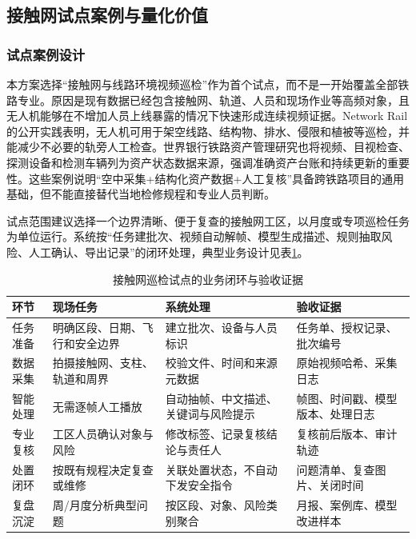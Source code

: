 \documentclass[UTF8,a4paper,zihao=-4]{ctexart}
\begin{document}
\subsection{接触网试点案例与量化价值}

\subsubsection{试点案例设计}

本方案选择“接触网与线路环境视频巡检”作为首个试点，而不是一开始覆盖全部铁路专业。原因是现有数据已经包含接触网、轨道、人员和现场作业等高频对象，且无人机能够在不增加人员上线暴露的情况下快速形成连续视频证据。Network Rail 的公开实践表明，无人机可用于架空线路、结构物、排水、侵限和植被等巡检，并能减少不必要的轨旁人工检查\cite{networkrail-drones}。世界银行铁路资产管理研究也将视频、目视检查、探测设备和检测车辆列为资产状态数据来源，强调准确资产台账和持续更新的重要性\cite{worldbank-rail-asset}。这些案例说明“空中采集+结构化资产数据+人工复核”具备跨铁路项目的通用基础，但不能直接替代当地检修规程和专业人员判断。

试点范围建议选择一个边界清晰、便于复查的接触网工区，以月度或专项巡检任务为单位运行。系统按“任务建批次、视频自动解帧、模型生成描述、规则抽取风险、人工确认、导出记录”的闭环处理，典型业务设计见表\ref{tab:pilot-case}。

\begin{table}[H]
\centering
\caption{接触网巡检试点的业务闭环与验收证据}
\label{tab:pilot-case}
\small
\begin{tabularx}{\textwidth}{p{}p{}p{}X}
\toprule
环节 & 现场任务 & 系统处理 & 验收证据 \\
\midrule
任务准备 & 明确区段、日期、飞行和安全边界 & 建立批次、设备与人员标识 & 任务单、授权记录、批次编号 \\
数据采集 & 拍摄接触网、支柱、轨道和周界 & 校验文件、时间和来源元数据 & 原始视频哈希、采集日志 \\
智能处理 & 无需逐帧人工播放 & 自动抽帧、中文描述、关键词与风险提示 & 帧图、时间戳、模型版本、处理日志 \\
专业复核 & 工区人员确认对象与风险 & 修改标签、记录复核结论与责任人 & 复核前后版本、审计轨迹 \\
处置闭环 & 按既有规程决定复查或维修 & 关联处置状态，不自动下发安全指令 & 问题清单、复查图片、关闭时间 \\
复盘沉淀 & 周/月度分析典型问题 & 按区段、对象、风险类别聚合 & 月报、案例库、模型改进样本 \\
\bottomrule
\end{tabularx}
\end{table}
\end{document}
